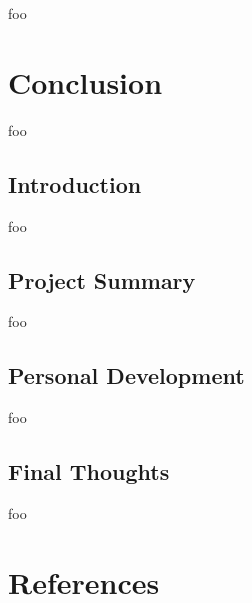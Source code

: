 \documentclass[12pt, a4paper]{article}
\begin{document}




foo

\pagebreak


\section{Conclusion}

foo


\subsection{Introduction}

foo


\subsection{Project Summary}


foo


\subsection{Personal Development}

foo


\subsection{Final Thoughts}

foo

\pagebreak



\section{References}

\renewcommand{\refname}{\vskip -1cm}

\end{document}
